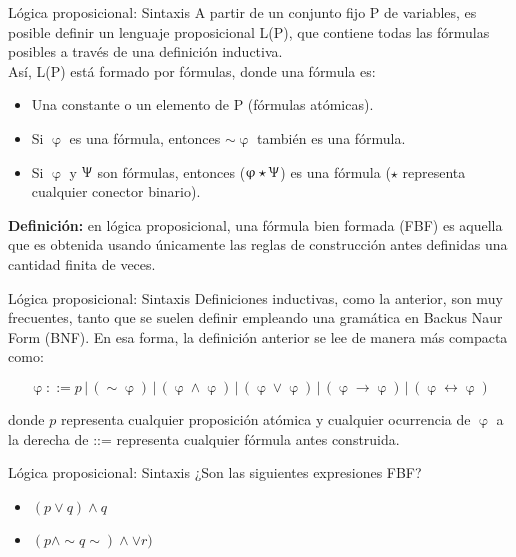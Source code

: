 \documentclass{beamer}
\begin{document}
\begin{frame}{Lógica proposicional: Sintaxis}
  A partir de un conjunto fijo P de variables, es posible definir un lenguaje
  proposicional L(P), que contiene todas las fórmulas posibles a través de una
  definición inductiva.\\

  Así, L(P) está formado por fórmulas, donde una fórmula es:
  \begin{itemize}
    \item Una constante o un elemento de P (fórmulas atómicas).
    \item Si $\upvarphi$ es una fórmula, entonces $\sim \upvarphi$ también es
          una fórmula.
    \item Si $\upvarphi$ y $\Uppsi$ son fórmulas, entonces
          ($\upvarphi \star \Uppsi$) es una fórmula ($\star$ representa
          cualquier conector binario).
  \end{itemize}

  \textbf{Definición:} en lógica proposicional, una fórmula bien formada (FBF)
  es aquella que es obtenida usando únicamente las reglas de construcción antes
  definidas una cantidad finita de veces.
\end{frame}


\begin{frame}{Lógica proposicional: Sintaxis}
  Deﬁniciones inductivas, como la anterior, son muy frecuentes, tanto que se
  suelen definir empleando una gramática en Backus Naur Form (BNF). En esa
  forma, la definición anterior se lee de manera más compacta como:

  $$\upvarphi ::= p \,|\, (\sim \upvarphi) \,|\, (\upvarphi \land \upvarphi) \,|\,  (\upvarphi \vee \upvarphi) \,|\,  (\upvarphi \rightarrow \upvarphi) \,|\,  (\upvarphi \leftrightarrow \upvarphi)$$

  donde $p$ representa cualquier proposición atómica y cualquier ocurrencia de
  $\upvarphi$ a la derecha de ::= representa cualquier fórmula antes construida.
\end{frame}


\begin{frame}{Lógica proposicional: Sintaxis}
  ¿Son las siguientes expresiones FBF?
  \begin{itemize}
    \item $(p \vee q) \land q$
    \item $(p \land \sim q \sim) \land \vee r)$
  \end{itemize}
\end{frame}
\end{document}
